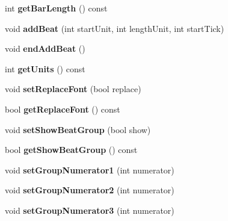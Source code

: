 \begin{DoxyCompactItemize}
int {\bfseries get\+Bar\+Length} () const
\item 
\mbox{\label{class_o_v_e_1_1_time_signature_acf56e08d357ae9b41da1e1a52359a93e}} 
void {\bfseries add\+Beat} (int start\+Unit, int length\+Unit, int start\+Tick)
\item 
\mbox{\label{class_o_v_e_1_1_time_signature_a2c8c0b85aafda03ccd1b9fbc746a8de8}} 
void {\bfseries end\+Add\+Beat} ()
\item 
\mbox{\label{class_o_v_e_1_1_time_signature_ae47b1cef581831a88238db065c94a32a}} 
int {\bfseries get\+Units} () const
\item 
\mbox{\label{class_o_v_e_1_1_time_signature_a1b0a4ab0da7da832287cdfaae737afbf}} 
void {\bfseries set\+Replace\+Font} (bool replace)
\item 
\mbox{\label{class_o_v_e_1_1_time_signature_a2523b5300cfe28695fa78d0a830f2ee1}} 
bool {\bfseries get\+Replace\+Font} () const
\item 
\mbox{\label{class_o_v_e_1_1_time_signature_a15b206e5ae646b4301431fb005eb087b}} 
void {\bfseries set\+Show\+Beat\+Group} (bool show)
\item 
\mbox{\label{class_o_v_e_1_1_time_signature_a6cd45935d67523903791757ca0650a15}} 
bool {\bfseries get\+Show\+Beat\+Group} () const
\item 
\mbox{\label{class_o_v_e_1_1_time_signature_a026a6df1d29097ff1367e7c993bf00a6}} 
void {\bfseries set\+Group\+Numerator1} (int numerator)
\item 
\mbox{\label{class_o_v_e_1_1_time_signature_ac5b759ca303e210bd0ccdf01698add2e}} 
void {\bfseries set\+Group\+Numerator2} (int numerator)
\item 
\mbox{\label{class_o_v_e_1_1_time_signature_aaaeac996c0fd8c76bf7efe217bc246e4}} 
void {\bfseries set\+Group\+Numerator3} (int numerator)

\end{DoxyCompactItemize}

